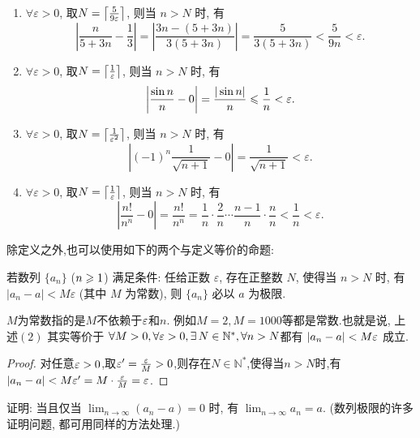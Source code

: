 \begin{solution}
    \begin{enumerate}
        \item $\forall \varepsilon > 0$, 取$N = \llceil \frac{5}{9\varepsilon} \rrceil$, 则当 $n > N$ 时, 有
              $$
                  \left| \frac{n}{5 + 3n} - \frac{1}{3} \right| = \left| \frac{3n - (5 + 3n)}{3(5 + 3n)} \right| = \frac{5}{3(5 + 3n)} < \frac{5}{9n} < \varepsilon.
              $$
        \item $\forall \varepsilon > 0$, 取$N = \llceil \frac{1}{\varepsilon} \rrceil$, 则当 $n > N$ 时, 有
              $$
                  \left| \frac{\sin n}{n} - 0 \right| = \frac{|\sin n|}{n} \les \frac{1}{n} < \varepsilon.
              $$
        \item $\forall \varepsilon > 0$, 取$N = \llceil \frac{1}{\varepsilon^2}  \rrceil$, 则当 $n > N$ 时, 有
              $$
                  \left| (-1)^n \frac{1}{\sqrt{n + 1}} - 0 \right| = \frac{1}{\sqrt{n + 1}} < \varepsilon.
              $$
        \item $\forall \varepsilon > 0$, 取$N = \llceil \frac{1}{\varepsilon} \rrceil$, 则当 $n > N$ 时, 有
              $$
                  \left| \frac{n!}{n^n} - 0 \right| = \frac{n!}{n^n} = \frac{1}{n} \cdot \frac{2}{n} \cdots \frac{n - 1}{n} \cdot \frac{n}{n} < \frac{1}{n} < \varepsilon.
              $$
    \end{enumerate}
\end{solution}

除定义之外,也可以使用如下的两个与定义等价的命题:

\begin{exercise}[1.2.2]
    若数列 $\{a_n\}$ ($n \ges 1$) 满足条件: 任给正数 $\varepsilon$, 存在正整数 $N$, 使得当 $n > N$ 时, 有 $|a_n - a| < M\varepsilon$ (其中 $M$ 为常数), 则 $\{a_n\}$ 必以 $a$ 为极限.
\end{exercise}

$M$为常数指的是$M$不依赖于$\ve$和$n$. 例如$M=2, M=1000$等都是常数.也就是说, 上述$(2)$ 其实等价于
$\forall M > 0, \forall \ve >0, \exists N\in \mathbb{N}^*, \forall n>N $都有 $|a_n-a|<M \ve$ 成立.

\begin{proof}
    对任意$\ve >0$,取$\ve' = \frac{\ve}{M} > 0$,则存在$N \in \mathbb{N}^*$,使得当$n > N$时,有$|a_n - a| < M\ve' = M \cdot \frac{\ve}{M} = \ve$.
\end{proof}

\begin{exercise}[1.2.3]
    证明: 当且仅当 $\lim_{n\to\infty} (a_n - a) = 0$ 时, 有 $\lim_{n\to\infty} a_n = a$. (数列极限的许多证明问题, 都可用同样的方法处理.)
\end{exercise}

